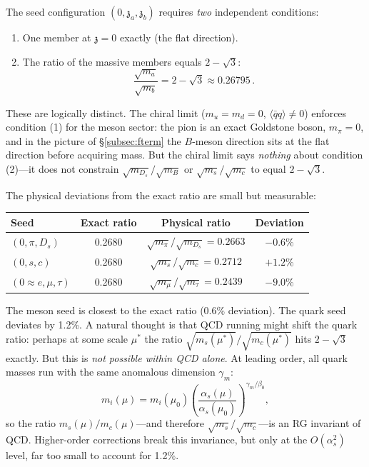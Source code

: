 \documentclass[12pt,a4paper]{article}
\newcommand{\qqbar}{\langle\bar{q}q\rangle}
\newcommand{\zch}{\mathfrak{z}}
\begin{document}
The seed configuration $(0, \zch_a, \zch_b)$ requires \emph{two} 
independent conditions:
\begin{enumerate}
\item One member at $\zch = 0$ exactly (the flat direction).
\item The ratio of the massive members equals $2 - \sqrt{3}$:
\begin{equation}
\label{eq:seedratio}
\frac{\sqrt{m_a}}{\sqrt{m_b}} = 2 - \sqrt{3} \approx 0.26795\,.
\end{equation}
\end{enumerate}
These are logically distinct. The chiral limit ($m_u = m_d = 0$, 
$\qqbar \neq 0$) enforces condition (1) for the meson sector: the 
pion is an exact Goldstone boson, $m_\pi = 0$, and in the 
picture of \S\ref{subsec:fterm} the $B$-meson direction sits at 
the flat direction before acquiring mass. But the chiral limit says 
\emph{nothing} about condition (2)---it does not constrain 
$\sqrt{m_{D_s}}/\sqrt{m_B}$ or $\sqrt{m_s}/\sqrt{m_c}$ 
to equal $2 - \sqrt{3}$.

The physical deviations from the exact ratio are small but 
measurable:

\begin{center}
\begin{tabular}{lccc}
\toprule
Seed & Exact ratio & Physical ratio & Deviation \\
\midrule
$(0, \pi, D_s)$ & 0.2680 & 
$\sqrt{m_\pi}/\sqrt{m_{D_s}} = 0.2663$ & $-0.6\%$ \\
$(0, s, c)$ & 0.2680 & 
$\sqrt{m_s}/\sqrt{m_c} = 0.2712$ & $+1.2\%$ \\
$(0 \approx e, \mu, \tau)$ & 0.2680 & 
$\sqrt{m_\mu}/\sqrt{m_\tau} = 0.2439$ & $-9.0\%$ \\
\bottomrule
\end{tabular}
\end{center}

The meson seed is closest to the exact ratio (0.6\% deviation). 
The quark seed deviates by 1.2\%. A natural thought is that QCD 
running might shift the quark ratio: perhaps at some scale $\mu^*$ 
the ratio $\sqrt{m_s(\mu^*)}/\sqrt{m_c(\mu^*)}$ hits $2 - \sqrt{3}$ 
exactly. But this is \emph{not possible within QCD alone}. At leading 
order, all quark masses run with the same anomalous dimension 
$\gamma_m$:
\begin{equation}
m_i(\mu) = m_i(\mu_0)\left(\frac{\alpha_s(\mu)}{\alpha_s(\mu_0)}\right)^{\gamma_m/\beta_0},
\end{equation}
so the ratio $m_s(\mu)/m_c(\mu)$---and therefore 
$\sqrt{m_s}/\sqrt{m_c}$---is an RG invariant of QCD. Higher-order 
corrections break this invariance, but only at the $O(\alpha_s^2)$ 
level, far too small to account for 1.2\%.
\end{document}
